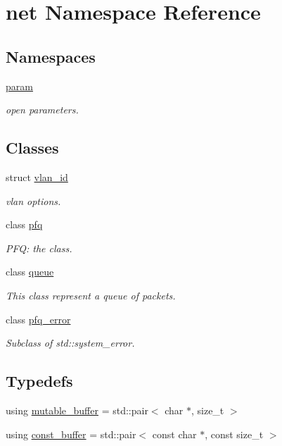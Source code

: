 \hypertarget{namespacenet}{\section{net Namespace Reference}
\label{namespacenet}
}
\subsection*{Namespaces}
\begin{DoxyCompactItemize}
\item 
\hyperlink{namespacenet_1_1param}{param}
\begin{DoxyCompactList}\small\item\em open parameters. \end{DoxyCompactList}\end{DoxyCompactItemize}
\subsection*{Classes}
\begin{DoxyCompactItemize}
\item 
struct \hyperlink{structnet_1_1vlan__id}{vlan\-\_\-id}
\begin{DoxyCompactList}\small\item\em vlan options. \end{DoxyCompactList}\item 
class \hyperlink{classnet_1_1pfq}{pfq}
\begin{DoxyCompactList}\small\item\em P\-F\-Q\-: the class. \end{DoxyCompactList}\item 
class \hyperlink{classnet_1_1queue}{queue}
\begin{DoxyCompactList}\small\item\em This class represent a queue of packets. \end{DoxyCompactList}\item 
class \hyperlink{classnet_1_1pfq__error}{pfq\-\_\-error}
\begin{DoxyCompactList}\small\item\em Subclass of std\-::system\-\_\-error. \end{DoxyCompactList}\end{DoxyCompactItemize}
\subsection*{Typedefs}
\begin{DoxyCompactItemize}
\item 
using \hyperlink{namespacenet_ac0df3fa0efbc044d8a2441906e8f61cb}{mutable\-\_\-buffer} = std\-::pair$<$ char $\ast$, size\-\_\-t $>$
\item 
using \hyperlink{namespacenet_a05639001760fe5164b163078b5ccc2c0}{const\-\_\-buffer} = std\-::pair$<$ const char $\ast$, const size\-\_\-t $>$
\end{DoxyCompactItemize}
